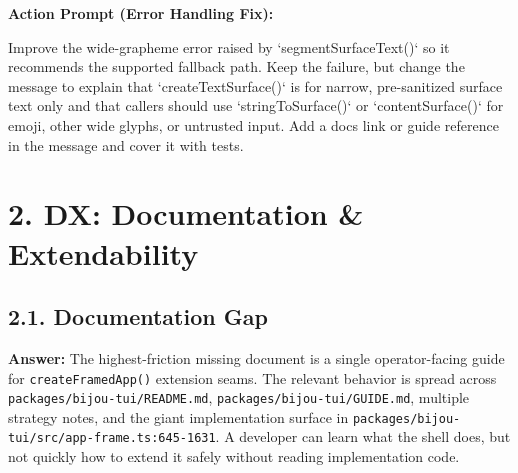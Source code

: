 \textbf{Action Prompt (Error Handling Fix):}

\begin{CodeBlock}
Improve the wide-grapheme error raised by `segmentSurfaceText()` so it recommends the supported fallback path. Keep the failure, but change the message to explain that `createTextSurface()` is for narrow, pre-sanitized surface text only and that callers should use `stringToSurface()` or `contentSurface()` for emoji, other wide glyphs, or untrusted input. Add a docs link or guide reference in the message and cover it with tests.
\end{CodeBlock}

\section{2. DX: Documentation \& Extendability}\label{record-416-dx-documentation-extendability}

\subsection{2.1. Documentation Gap}\label{record-416-documentation-gap}

\textbf{Answer:} The highest-friction missing document is a single operator-facing guide for \texttt{c\allowbreak{}r\allowbreak{}e\allowbreak{}a\allowbreak{}t\allowbreak{}e\allowbreak{}F\allowbreak{}r\allowbreak{}a\allowbreak{}m\allowbreak{}e\allowbreak{}d\allowbreak{}A\allowbreak{}p\allowbreak{}p\allowbreak{}(\allowbreak{})} extension seams. The relevant behavior is spread across \texttt{p\allowbreak{}a\allowbreak{}c\allowbreak{}k\allowbreak{}a\allowbreak{}g\allowbreak{}e\allowbreak{}s\allowbreak{}/\allowbreak{}b\allowbreak{}i\allowbreak{}j\allowbreak{}o\allowbreak{}u\allowbreak{}-\allowbreak{}t\allowbreak{}u\allowbreak{}i\allowbreak{}/\allowbreak{}R\allowbreak{}E\allowbreak{}A\allowbreak{}D\allowbreak{}M\allowbreak{}E\allowbreak{}.\allowbreak{}m\allowbreak{}d}, \texttt{p\allowbreak{}a\allowbreak{}c\allowbreak{}k\allowbreak{}a\allowbreak{}g\allowbreak{}e\allowbreak{}s\allowbreak{}/\allowbreak{}b\allowbreak{}i\allowbreak{}j\allowbreak{}o\allowbreak{}u\allowbreak{}-\allowbreak{}t\allowbreak{}u\allowbreak{}i\allowbreak{}/\allowbreak{}G\allowbreak{}U\allowbreak{}I\allowbreak{}D\allowbreak{}E\allowbreak{}.\allowbreak{}m\allowbreak{}d}, multiple strategy notes, and the giant implementation surface in \texttt{p\allowbreak{}a\allowbreak{}c\allowbreak{}k\allowbreak{}a\allowbreak{}g\allowbreak{}e\allowbreak{}s\allowbreak{}/\allowbreak{}b\allowbreak{}i\allowbreak{}j\allowbreak{}o\allowbreak{}u\allowbreak{}-\allowbreak{}t\allowbreak{}u\allowbreak{}i\allowbreak{}/\allowbreak{}s\allowbreak{}r\allowbreak{}c\allowbreak{}/\allowbreak{}a\allowbreak{}p\allowbreak{}p\allowbreak{}-\allowbreak{}f\allowbreak{}r\allowbreak{}a\allowbreak{}m\allowbreak{}e\allowbreak{}.\allowbreak{}t\allowbreak{}s\allowbreak{}:\allowbreak{}6\allowbreak{}4\allowbreak{}5\allowbreak{}-\allowbreak{}1\allowbreak{}6\allowbreak{}3\allowbreak{}1}. A developer can learn what the shell does, but not quickly how to extend it safely without reading implementation code.


